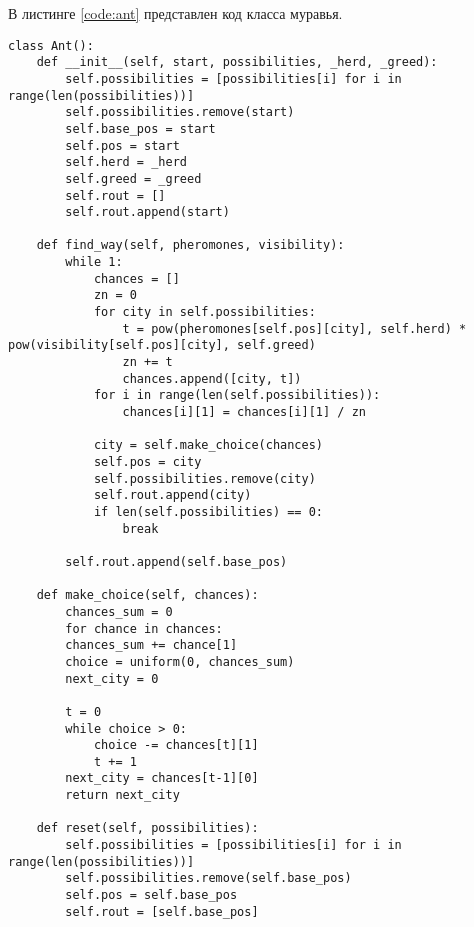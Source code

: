 \par В листинге \ref{code:ant} представлен код класса муравья.
\begin{lstlisting}[caption= Класс муравья, label=code:ant]
class Ant():
	def __init__(self, start, possibilities, _herd, _greed):
		self.possibilities = [possibilities[i] for i in range(len(possibilities))]
		self.possibilities.remove(start)
		self.base_pos = start
		self.pos = start
		self.herd = _herd
		self.greed = _greed
		self.rout = []
		self.rout.append(start)
	
	def find_way(self, pheromones, visibility):
		while 1:
			chances = []
			zn = 0
			for city in self.possibilities:
				t = pow(pheromones[self.pos][city], self.herd) * pow(visibility[self.pos][city], self.greed)
				zn += t
				chances.append([city, t])
			for i in range(len(self.possibilities)):
				chances[i][1] = chances[i][1] / zn
			
			city = self.make_choice(chances)
			self.pos = city
			self.possibilities.remove(city)
			self.rout.append(city)
			if len(self.possibilities) == 0:
				break
	
		self.rout.append(self.base_pos)
	
	def make_choice(self, chances):
		chances_sum = 0
		for chance in chances:
		chances_sum += chance[1]
		choice = uniform(0, chances_sum)     
		next_city = 0
		
		t = 0
		while choice > 0:
			choice -= chances[t][1]
			t += 1
		next_city = chances[t-1][0]
		return next_city
	
	def reset(self, possibilities):
		self.possibilities = [possibilities[i] for i in range(len(possibilities))]
		self.possibilities.remove(self.base_pos)
		self.pos = self.base_pos
		self.rout = [self.base_pos]

\end{lstlisting}

